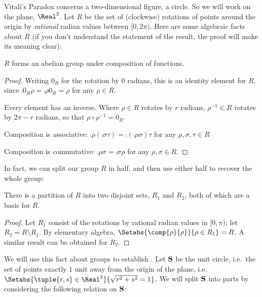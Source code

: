 \documentclass[../../../include/open-logic-section]{subfiles}
\begin{document}
\newcommand\rotationsgroup{R}
Vitali's Paradox concerns a two-dimensional figure, a circle. So we will work on the plane, $\Real^2$. Let $\rotationsgroup$ be the set of (clockwise) rotations of points around the origin by \emph{rational} radian values between $[0,2\pi)$. Here are some algebraic facts about $\rotationsgroup$ (if you don't understand the statement of the result, the proof will make its meaning clear):
\begin{lem}
	$\rotationsgroup$ forms an abelian {group} under composition of functions.
\end{lem}
\begin{proof}
	Writing $0_{\rotationsgroup}$ for the rotation by $0$ radians, this is an identity element for $\rotationsgroup$, since $\comp{0_{\rotationsgroup}}{\rho} = \comp{\rho}{0_{\rotationsgroup}} = \rho$ for any $\rho \in \rotationsgroup$.
	
	Every element has an inverse. Where $\rho \in \rotationsgroup$ rotates by $r$ radians, $\rho^{-1} \in \rotationsgroup$ rotates by $2\pi - r$ radians, so that $\rho \circ \rho^{-1} = 0_\rotationsgroup$.
	
	Composition is associative: $\comp{\rho}{(\comp{\sigma}{\tau})} = \comp{(\comp{\rho}{\sigma})}{\tau}$ for any $\rho, \sigma, \tau \in \rotationsgroup$
	
	Composition is commutative: $\comp{\rho}{\sigma} = \comp{\sigma}{\rho}$ for any $\rho, \sigma \in \rotationsgroup$.
\end{proof}\noindent 
In fact, we can split our group $\rotationsgroup$ in half, and then use either half to recover the whole group:
\begin{lem}
	There is a partition of $\rotationsgroup$ into two disjoint sets, $\rotationsgroup_{1}$ and $\rotationsgroup_{2}$, both of which are a basis for $\rotationsgroup$. 
\end{lem}
\begin{proof}
	Let $\rotationsgroup_{1}$ consist of the rotations by rational radian values in $[0, \pi)$; let $\rotationsgroup_{2} = \rotationsgroup \setminus \rotationsgroup_1$. By elementary algebra, $\Setabs{\comp{\rho}{\rho}}{\rho \in \rotationsgroup_1} = \rotationsgroup$. A similar result can be obtained for $\rotationsgroup_2$.
\end{proof}\noindent
We will use this fact about groups to establish . Let $\mathbf{S}$ be the unit circle, i.e.\ the set of points exactly $1$ unit away from the origin of the plane, i.e.\ $\Setabs{\tuple{r,s}\in\Real^2}{\sqrt{r^2+s^2}=1}$. We will split $\mathbf{S}$ into parts by considering the following relation on $\mathbf{S}$:
\end{document}
